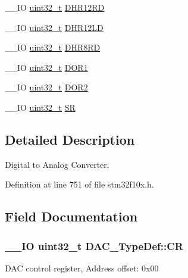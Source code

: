 \begin{DoxyCompactItemize}
\item 
\-\_\-\-\_\-\-I\-O \hyperlink{stdint_8h_a435d1572bf3f880d55459d9805097f62}{uint32\-\_\-t} \hyperlink{struct_d_a_c___type_def_affa5cc9fe0cc9eb594d703bdc9d9abd9}{D\-H\-R12\-R\-D}
\item 
\-\_\-\-\_\-\-I\-O \hyperlink{stdint_8h_a435d1572bf3f880d55459d9805097f62}{uint32\-\_\-t} \hyperlink{struct_d_a_c___type_def_aea4d055e3697999b44cdcf2702d79d40}{D\-H\-R12\-L\-D}
\item 
\-\_\-\-\_\-\-I\-O \hyperlink{stdint_8h_a435d1572bf3f880d55459d9805097f62}{uint32\-\_\-t} \hyperlink{struct_d_a_c___type_def_a03f8d95bbf0ce3a53cb79506d5bf995a}{D\-H\-R8\-R\-D}
\item 
\-\_\-\-\_\-\-I\-O \hyperlink{stdint_8h_a435d1572bf3f880d55459d9805097f62}{uint32\-\_\-t} \hyperlink{struct_d_a_c___type_def_a50b4f0b0d2a376f729c8d7acf47864c3}{D\-O\-R1}
\item 
\-\_\-\-\_\-\-I\-O \hyperlink{stdint_8h_a435d1572bf3f880d55459d9805097f62}{uint32\-\_\-t} \hyperlink{struct_d_a_c___type_def_a1bde8391647d6422b39ab5ba4f13848b}{D\-O\-R2}
\item 
\-\_\-\-\_\-\-I\-O \hyperlink{stdint_8h_a435d1572bf3f880d55459d9805097f62}{uint32\-\_\-t} \hyperlink{struct_d_a_c___type_def_a1d3fd83d6ed8b2d90b471db4509b0e70}{S\-R}
\end{DoxyCompactItemize}


\subsection{Detailed Description}
Digital to Analog Converter. 

Definition at line 751 of file stm32f10x.\-h.



\subsection{Field Documentation}
\hypertarget{struct_d_a_c___type_def_a394324f0b573837ca15a87127b2a37ea}{
\subsubsection[{C\-R}]{\setlength{\rightskip}{0pt plus 5cm}\-\_\-\-\_\-\-I\-O {\bf uint32\-\_\-t} D\-A\-C\-\_\-\-Type\-Def\-::\-C\-R}}\label{struct_d_a_c___type_def_a394324f0b573837ca15a87127b2a37ea}
D\-A\-C control register, Address offset\-: 0x00 

